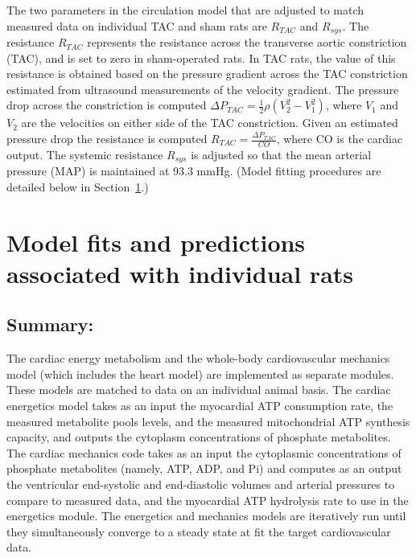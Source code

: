 \documentclass[fleqn,10pt]{physiome}
\begin{document}
The two parameters in the circulation model that are adjusted to match measured data on individual TAC and sham rats are $R_{TAC}$ and $R_{sys}$. The resistance $R_{TAC}$ represents the resistance across the transverse aortic constriction (TAC), and is set to zero in sham-operated rats. In TAC rats, the value of this resistance is obtained based on the pressure gradient across the TAC constriction estimated from ultrasound measurements of the velocity gradient. The pressure drop across the constriction is computed $\Delta P_{TAC} = \frac{1}{2} \rho (V_{2}^{2} - V_{1}^{2})$, where $V_{1}$ and $V_{2}$ are the velocities on either side of the TAC constriction. Given an estimated pressure drop the resistance is computed $R_{TAC} = \frac{\Delta P_{TAC}}{CO}$, where CO is the cardiac output. The systemic resistance $R_{sys}$ is adjusted so that the mean arterial pressure (MAP) is maintained at 93.3 mmHg. (Model fitting procedures are detailed below in Section~\ref{sec:ModelFits}.)

\section{Model fits and predictions associated with individual rats}\label{sec:ModelFits}

\subsection{Summary:}

The cardiac energy metabolism and the whole-body cardiovascular mechanics model (which includes the heart model) are implemented as separate modules. These models are matched to data on an individual animal basis. The cardiac energetics model takes as an input the myocardial ATP consumption rate, the measured metabolite pools levels, and the measured mitochondrial ATP synthesis capacity, and outputs the cytoplasm concentrations of phosphate metabolites. The cardiac mechanics code takes as an input the cytoplasmic concentrations of phosphate metabolites (namely, ATP, ADP, and Pi) and computes as an output the ventricular end-systolic and end-diastolic volumes and arterial pressures to compare to measured data, and the myocardial ATP hydrolysis rate to use in the energetics module. The energetics and mechanics models are iteratively run until they simultaneously converge to a steady state at fit the target cardiovascular data.
\end{document}

